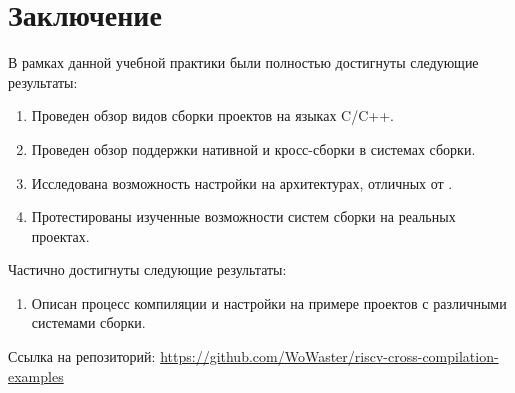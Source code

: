 
\section*{Заключение}

В рамках данной учебной практики были полностью достигнуты следующие результаты:
\begin{enumerate}
	\item Проведен обзор видов сборки проектов на языках \textsc{C}/\textsc{C++}.
	\item Проведен обзор поддержки нативной и кросс-сборки в системах сборки.
	\item Исследована возможность настройки \ci{} на архитектурах, отличных от \amd{}.
	\item Протестированы изученные возможности систем сборки на реальных проектах.
\end{enumerate}
Частично достигнуты следующие результаты:
\begin{enumerate}
	\item Описан процесс компиляции и настройки \ci{} на примере проектов с различными системами сборки.
\end{enumerate}

Ссылка на репозиторий: \url{https://github.com/WoWaster/riscv-cross-compilation-examples}
